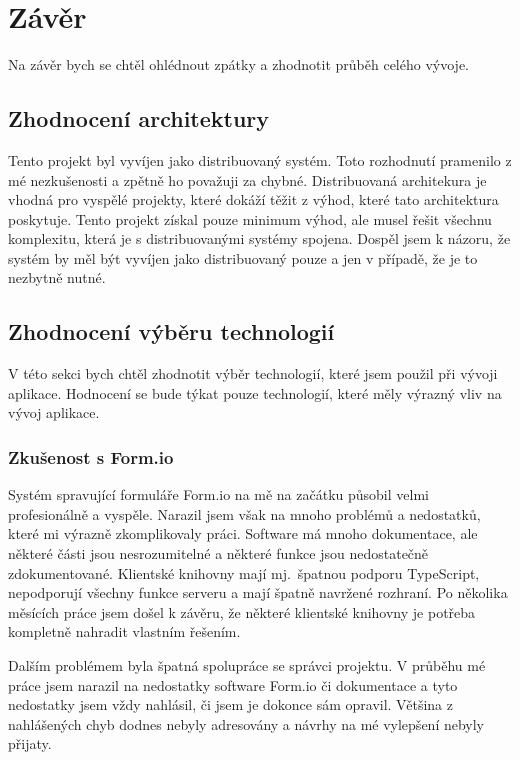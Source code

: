 \chapter*{Závěr}

Na závěr bych se chtěl ohlédnout zpátky a zhodnotit průběh celého vývoje.


\section{Zhodnocení architektury}\label{sec:zhodnoceni-architektury}

Tento projekt byl vyvíjen jako distribuovaný systém.
Toto rozhodnutí pramenilo z mé nezkušenosti a zpětně ho považuji za chybné.
Distribuovaná architekura je vhodná pro vyspělé projekty, které dokáží těžit z výhod, které tato architektura poskytuje.
Tento projekt získal pouze minimum výhod, ale musel řešit všechnu komplexitu, která je s distribuovanými systémy spojena.
Dospěl jsem k názoru, že systém by měl být vyvíjen jako distribuovaný pouze a jen v případě, že je to nezbytně nutné.


\section{Zhodnocení výběru technologií}\label{sec:vyber-technologii-zaver}

V této sekci bych chtěl zhodnotit výběr technologií, které jsem použil při vývoji aplikace.
Hodnocení se bude týkat pouze technologií, které měly výrazný vliv na vývoj aplikace.

\subsection{Zkušenost s Form.io}\label{subsec:zkusenost-s-formio}

Systém spravující formuláře Form.io na mě na začátku působil velmi profesionálně a vyspěle.
Narazil jsem však na mnoho problémů a nedostatků, které mi výrazně zkomplikovaly práci.
Software má mnoho dokumentace, ale některé části jsou nesrozumitelné a některé funkce jsou nedostatečně zdokumentované.
Klientské knihovny mají mj.\ špatnou podporu TypeScript, nepodporují všechny funkce serveru a mají špatně navržené rozhraní.
Po několika měsících práce jsem došel k závěru, že některé klientské knihovny je potřeba kompletně nahradit vlastním řešením.

Dalším problémem byla špatná spolupráce se správci projektu.
V průběhu mé práce jsem narazil na nedostatky software Form.io či dokumentace a tyto nedostatky jsem vždy nahlásil, či jsem je dokonce sám opravil.
Většina z nahlášených chyb dodnes nebyly adresovány a návrhy na mé vylepšení nebyly přijaty.

